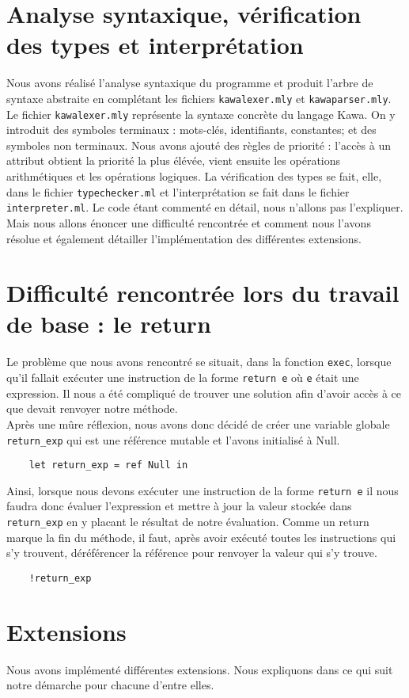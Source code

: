 \documentclass{article}
\begin{document}
\section{Analyse syntaxique, vérification des types et interprétation}
Nous avons réalisé l'analyse syntaxique du programme et produit l'arbre de syntaxe abstraite en complétant les fichiers \texttt{kawalexer.mly} et \texttt{kawaparser.mly}. Le fichier \texttt{kawalexer.mly} représente la syntaxe concrète du langage Kawa. On y introduit des symboles terminaux :  mots-clés, identifiants, constantes; et des symboles non terminaux. Nous avons ajouté des règles de priorité : l'accès à un attribut obtient la priorité la plus élévée, vient ensuite  les opérations arithmétiques et les opérations logiques.
La vérification des types se fait, elle, dans le fichier \texttt{typechecker.ml} et l'interprétation se fait dans le fichier \texttt{interpreter.ml}.
Le code étant commenté en détail, nous n'allons pas l'expliquer. Mais nous allons énoncer une difficulté rencontrée et comment nous l'avons résolue et également détailler l'implémentation des différentes extensions. 
\section{Difficulté rencontrée lors du travail de base : le return}
Le problème que nous avons rencontré se situait, dans la fonction \texttt{exec}, lorsque qu'il fallait exécuter une instruction de la forme \texttt{return e} où \texttt{e} était une expression. Il nous a été compliqué de trouver une solution afin d'avoir accès à ce que devait renvoyer notre méthode.\\
Après une mûre réflexion, nous avons donc décidé de créer une variable globale \texttt{return\_exp} qui est une référence mutable et l'avons initialisé à Null.
\begin{verbatim}
    let return_exp = ref Null in
\end{verbatim}
Ainsi, lorsque nous devons exécuter une instruction de la forme \texttt{return e} il nous faudra donc évaluer l'expression et mettre à jour la valeur stockée dans \texttt{return\_exp} en y placant le résultat de notre évaluation. Comme un return marque la fin du méthode, il faut, après avoir exécuté toutes les instructions qui s'y trouvent, déréférencer la référence pour renvoyer la valeur qui s'y trouve.
\begin{verbatim}
    !return_exp
\end{verbatim}
\section{Extensions}
Nous avons implémenté différentes extensions. Nous expliquons dans ce qui suit notre démarche pour chacune d'entre elles.
\end{document}
